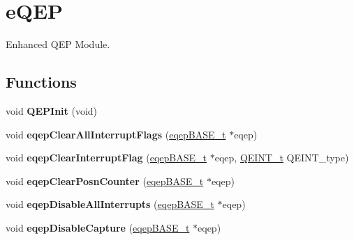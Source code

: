 \hypertarget{group__eQEP}{}\section{e\+Q\+EP}
\label{group__eQEP}


Enhanced Q\+EP Module.  


\subsection*{Functions}
\begin{DoxyCompactItemize}
\item 
\mbox{\label{group__eQEP_gac3ea398bdfdc9f37a0262f6b06044bfa}} 
void {\bfseries Q\+E\+P\+Init} (void)
\item 
\mbox{\label{group__eQEP_ga35ecf965926aad626ea929bb74242ded}} 
void {\bfseries eqep\+Clear\+All\+Interrupt\+Flags} (\mbox{\hyperlink{reg__eqep_8h_a794db63555812863c39c5d214fd4f215}{eqep\+B\+A\+S\+E\+\_\+t}} $\ast$eqep)
\item 
\mbox{\label{group__eQEP_ga46d88491763ace6ff6f0b708ae6bfe1d}} 
void {\bfseries eqep\+Clear\+Interrupt\+Flag} (\mbox{\hyperlink{reg__eqep_8h_a794db63555812863c39c5d214fd4f215}{eqep\+B\+A\+S\+E\+\_\+t}} $\ast$eqep, \mbox{\hyperlink{eqep_8h_af85f2f99be537503acd2fddf67e63caf}{Q\+E\+I\+N\+T\+\_\+t}} Q\+E\+I\+N\+T\+\_\+type)
\item 
\mbox{\label{group__eQEP_ga6cbc059882ffabcaee41c389f759ff05}} 
void {\bfseries eqep\+Clear\+Posn\+Counter} (\mbox{\hyperlink{reg__eqep_8h_a794db63555812863c39c5d214fd4f215}{eqep\+B\+A\+S\+E\+\_\+t}} $\ast$eqep)
\item 
\mbox{\label{group__eQEP_gacc45a4145de78215327667d13ba0ee46}} 
void {\bfseries eqep\+Disable\+All\+Interrupts} (\mbox{\hyperlink{reg__eqep_8h_a794db63555812863c39c5d214fd4f215}{eqep\+B\+A\+S\+E\+\_\+t}} $\ast$eqep)
\item 
\mbox{\label{group__eQEP_gac4281d3ce6ea2f2633528c2c4287c8f3}} 
void {\bfseries eqep\+Disable\+Capture} (\mbox{\hyperlink{reg__eqep_8h_a794db63555812863c39c5d214fd4f215}{eqep\+B\+A\+S\+E\+\_\+t}} $\ast$eqep)
\item 
\mbox{\label{group__eQEP_gaab18c71eae24083785dae656681b29ec}} 

\end{DoxyCompactItemize}
